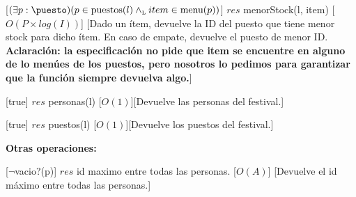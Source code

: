 \documentclass[../main.tex]{subfiles}
\begin{document}
\begin{interfaz}
{    
    [$(\exists p: \puesto) (p \in \text{puestos}(l) \yluego item \in \text{menu}(p))$]
    {$res$ \igobs menorStock(l, item)}
    [$O(P \times log(I))$]
    [Dado un ítem, devuelve la ID del puesto que tiene menor stock para dicho ítem. En caso de empate, devuelve el puesto de menor ID.
    \textbf{Aclaración: la especificación no pide que item se encuentre en alguno de lo menúes de los puestos, pero nosotros lo pedimos
    para garantizar que la función siempre devuelva algo.}]
    
    [true]
    {$res$ \igobs personas(l)}
    [$O(1)$][Devuelve las personas del festival.]   
    
    [true]
    {$res$ \igobs puestos(l)}
    [$O(1)$][Devuelve los puestos del festival.]
}

{\large\bfseries Otras operaciones: }

[$\neg$vacio?(p)]
{$res$ \igobs id maximo entre todas las personas.}
[$O(A)$]
[Devuelve el id máximo entre todas las personas.]

\end{interfaz}
\newpage
\end{document}

